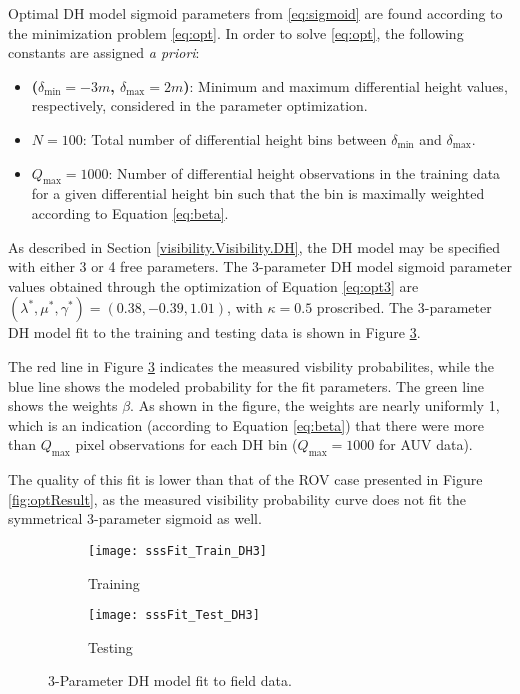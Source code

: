 Optimal DH model sigmoid parameters from \ref{eq:sigmoid} are found according to the minimization problem \ref{eq:opt}.
In order to solve \ref{eq:opt}, the following constants are assigned \emph{a priori}:

\begin{itemize}
\item \textbf{($\delta_{\text{min}} = -3m$, $\delta_{\text{max}} = 2m$)}: Minimum and maximum differential height values, respectively, considered in the parameter optimization.
\item \textbf{$N = 100$}: Total number of differential height bins between $\delta_{\text{min}}$ and $\delta_{\text{max}}$.
\item \textbf{$Q_{\text{max}} = 1000$}: Number of differential height observations in the training data for a given differential height bin such that the bin is maximally weighted according to Equation \ref{eq:beta}. 
\end{itemize} 

As described in Section \ref{visibility.Visibility.DH}, the DH model may be specified with either 3 or 4 free parameters.
The 3-parameter DH model sigmoid parameter values obtained through the optimization of Equation \ref{eq:opt3} are $(\lambda^*, \mu^*, \gamma^*) = (0.38,-0.39,1.01)$, with $\kappa = 0.5$ proscribed. 
The 3-parameter DH model fit to the training and testing data is shown in Figure \ref{fig:sss3paramFit}.

The red line in Figure \ref{fig:sss3paramFit} indicates the measured visbility probabilites, while the blue line shows the modeled probability for the fit parameters.  
The green line shows the weights $\beta$.
As shown in the figure, the weights are nearly uniformly 1, which is an indication (according to Equation \ref{eq:beta}) that there were more than $Q_{\text{max}}$ pixel observations for each DH bin ($Q_{\text{max}} = 1000$ for AUV data).

The quality of this fit is lower than that of the ROV case presented in Figure \ref{fig:optResult}, as the measured visibility probability curve does not fit the symmetrical 3-parameter sigmoid as well.

\begin{figure} [!h]
	\centering
	\begin{subfigure}[b]{0.48\textwidth}
                \texttt{[image: sssFit\_Train\_DH3]}
                \caption{Training}
                \label{}
	\end{subfigure}
  	\centering
	\begin{subfigure}[b]{0.48\textwidth}
                \texttt{[image: sssFit\_Test\_DH3]}
		\caption{Testing}
		\label{}
  	\end{subfigure}
	\caption{3-Parameter DH model fit to field data. }
	\label{fig:sss3paramFit}
\end{figure}

